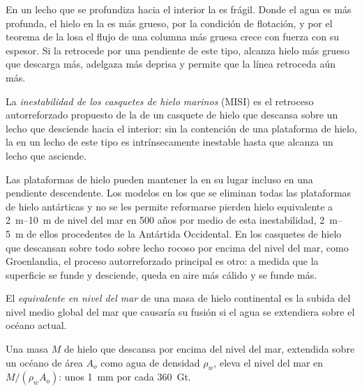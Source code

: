 En un lecho que se profundiza hacia el interior la  es frágil. Donde el
agua es más profunda, el hielo en la  es más grueso, por la condición de
flotación, y por el teorema de la losa el flujo de una columna más gruesa crece
con fuerza con su espesor. Si la  retrocede por una pendiente de este
tipo, alcanza hielo más grueso que descarga más, adelgaza más deprisa y permite que la
línea retroceda aún más.

\begin{definition}\label{def:b3:glaciology:misi}
La \emph{inestabilidad de los casquetes de hielo marinos}
(MISI) es el retroceso autorreforzado propuesto de la  de un
casquete de hielo que descansa sobre un lecho que desciende hacia el interior: sin
la contención de una plataforma de hielo, la  en un lecho de este tipo es
intrínsecamente inestable hasta que alcanza un lecho que asciende.
\end{definition}

Las plataformas de hielo pueden mantener la  en su lugar incluso en una pendiente descendente.
Los modelos en los que se eliminan todas las plataformas de hielo antárticas y no se les permite
reformarse pierden hielo equivalente a \qtyrange{2}{10}{m} de nivel del mar en 500
años por medio de esta inestabilidad, \qtyrange{2}{5}{m} de ellos procedentes de la
Antártida Occidental. En los casquetes de hielo que descansan sobre todo sobre lecho rocoso por encima del nivel del mar, como
Groenlandia, el proceso autorreforzado principal es otro: a medida que la superficie
se funde y desciende, queda en aire más cálido y se funde más.

\begin{definition}\label{def:b3:glaciology:sle}
El \emph{equivalente en nivel del mar} de una masa de
hielo continental es la subida del nivel medio global del mar que causaría su fusión
si el agua se extendiera sobre el océano actual.
\end{definition}

\begin{proposition}\label{prop:b3:glaciology:sle}
Una masa $M$ de hielo que descansa por encima del nivel del mar, extendida sobre un océano de área
$A_o$ como agua de densidad $\rho_w$, eleva el nivel del mar en $M/(\rho_wA_o)$:
unos \qty{1}{mm} por cada \qty{360}{Gt}.
\end{proposition}

